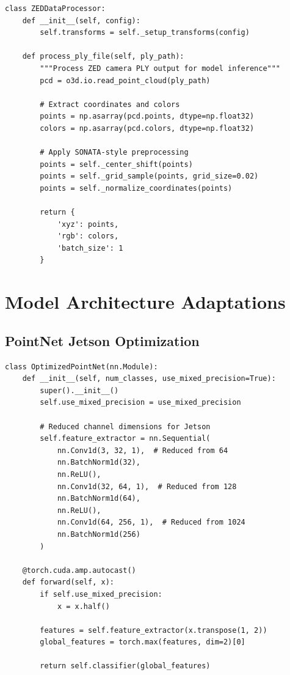 \documentclass[12pt,a4paper]{report}
\begin{document}
\begin{lstlisting}[caption=ZED Camera Data Processing Pipeline, label=lst:zed_pipeline]
class ZEDDataProcessor:
    def __init__(self, config):
        self.transforms = self._setup_transforms(config)

    def process_ply_file(self, ply_path):
        """Process ZED camera PLY output for model inference"""
        pcd = o3d.io.read_point_cloud(ply_path)

        # Extract coordinates and colors
        points = np.asarray(pcd.points, dtype=np.float32)
        colors = np.asarray(pcd.colors, dtype=np.float32)

        # Apply SONATA-style preprocessing
        points = self._center_shift(points)
        points = self._grid_sample(points, grid_size=0.02)
        points = self._normalize_coordinates(points)

        return {
            'xyz': points,
            'rgb': colors,
            'batch_size': 1
        }
\end{lstlisting}

\section{Model Architecture Adaptations}

\subsection{PointNet Jetson Optimization}

\begin{lstlisting}[caption=Optimized PointNet for Jetson Deployment, label=lst:optimized_pointnet]
class OptimizedPointNet(nn.Module):
    def __init__(self, num_classes, use_mixed_precision=True):
        super().__init__()
        self.use_mixed_precision = use_mixed_precision

        # Reduced channel dimensions for Jetson
        self.feature_extractor = nn.Sequential(
            nn.Conv1d(3, 32, 1),  # Reduced from 64
            nn.BatchNorm1d(32),
            nn.ReLU(),
            nn.Conv1d(32, 64, 1),  # Reduced from 128
            nn.BatchNorm1d(64),
            nn.ReLU(),
            nn.Conv1d(64, 256, 1),  # Reduced from 1024
            nn.BatchNorm1d(256)
        )

    @torch.cuda.amp.autocast()
    def forward(self, x):
        if self.use_mixed_precision:
            x = x.half()

        features = self.feature_extractor(x.transpose(1, 2))
        global_features = torch.max(features, dim=2)[0]

        return self.classifier(global_features)
\end{lstlisting}
\end{document}
